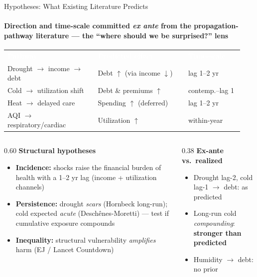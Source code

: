 \documentclass[aspectratio=169,11pt]{beamer}
\newcommand{\emphcolor}[1]{{\color{WarmOrange}\textbf{#1}}}
\newcommand{\tealtext}[1]{{\color{Teal}#1}}
\newcommand{\graytext}[1]{{\color{WarmGray}#1}}
\begin{document}
\begin{frame}{Hypotheses: What Existing Literature Predicts}
  \framesubtitle{Direction and time-scale committed \emph{ex ante} from the propagation-pathway literature --- the ``where should we be surprised?'' lens}
  \scriptsize
  \renewcommand{\arraystretch}{1.15}
  \begin{tabular}{@{}>{\raggedright\arraybackslash}p{0.36\linewidth}>{\raggedright\arraybackslash}p{0.36\linewidth}>{\raggedright\arraybackslash}p{0.22\linewidth}@{}}
    \rowcolor{DeepNavy}
    \textcolor{white}{\textbf{Pathway}} &
    \textcolor{white}{\textbf{Predicted effect}} &
    \textcolor{white}{\textbf{Time-scale}} \\
    \rowcolor{Teal!10}
    Drought \(\to\) income \(\to\) debt & Debt \emphcolor{\(\uparrow\)} (via income \(\downarrow\)) & lag 1--2 yr \\
    Cold \(\to\) utilization shift & Debt \& premiums \emphcolor{\(\uparrow\)} & contemp.--lag 1 \\
    \rowcolor{Teal!10}
    Heat \(\to\) delayed care & Spending \emphcolor{\(\uparrow\)} (deferred) & lag 1--2 yr \\
    AQI \(\to\) respiratory/cardiac & Utilization \emphcolor{\(\uparrow\)} & within-year \\
    \bottomrule
  \end{tabular}
  \vspace{0.45em}
  \begin{columns}[T]
    \begin{column}{0.60\textwidth}
      \footnotesize \textbf{\tealtext{Structural hypotheses}}
      \begin{itemize}\itemsep0.06em
        \item[\textbf{H1}] \textbf{Incidence:} shocks raise the financial burden of health with a 1--2 yr lag (income + utilization channels)
        \item[\textbf{H2}] \textbf{Persistence:} drought \emph{scars} (Hornbeck long-run); cold expected \emph{acute} (Desch\^enes-Moretti) --- test if cumulative exposure compounds
        \item[\textbf{H3}] \textbf{Inequality:} structural vulnerability \emph{amplifies} harm (EJ / Lancet Countdown)
      \end{itemize}
    \end{column}
    \begin{column}{0.38\textwidth}
      \footnotesize \textbf{\tealtext{Ex-ante vs.\ realized}}
      \begin{itemize}\itemsep0.06em
        \item Drought lag-2, cold lag-1 \(\to\) debt: \tealtext{as predicted}
        \item Long-run cold \emph{compounding}: \emphcolor{stronger than predicted}
        \item Humidity \(\to\) debt: \graytext{no prior}
      \end{itemize}
    \end{column}
  \end{columns}
\end{frame}
\end{document}
